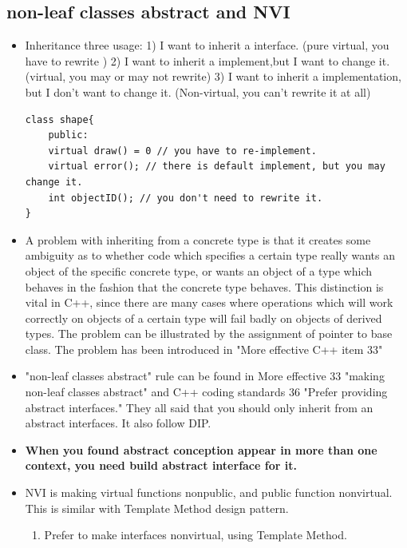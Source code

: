 \documentclass[a4paper,11pt,twoside]{book}
\begin{document}
\subsection{non-leaf classes abstract and NVI}

\begin{itemize}

\item Inheritance three usage: 1) I want to inherit a interface. (pure virtual, you have to rewrite ) 2) I want to inherit a implement,but I want to change it. (virtual, you may or may not rewrite) 3) I want to inherit a implementation, but I don't want to change it. (Non-virtual, you can't rewrite it at all)
\begin{lstlisting}[numbers=none]
class shape{
	public:
	virtual draw() = 0 // you have to re-implement.
	virtual error(); // there is default implement, but you may change it.
	int objectID(); // you don't need to rewrite it.
}	
\end{lstlisting}

	\item A problem with inheriting from a concrete type is that it creates some ambiguity as to whether code which specifies a certain type really wants an object of the specific concrete type, or wants an object of a type which behaves in the fashion that the concrete type behaves. This distinction is vital in C++, since there are many cases where operations which will work correctly on objects of a certain type will fail badly on objects of derived types. The problem can be illustrated by the assignment of pointer to base class. The problem has been introduced in "More effective C++ item 33"
	

	\item "non-leaf classes abstract" rule can be found in More effective 33 "making non-leaf classes abstract" and C++ coding standards 36 "Prefer providing abstract interfaces." They all said that you should only inherit from an abstract interfaces. It also follow DIP.

	\item \textbf{When you found abstract conception appear in more than one context, you need build abstract interface for it. }


	\item NVI is making virtual functions nonpublic, and public function nonvirtual. This is similar with Template Method design pattern.  

\begin{enumerate}
	\item Prefer to make interfaces nonvirtual, using Template Method.
	

\end{enumerate}
\end{itemize}
\end{document}
